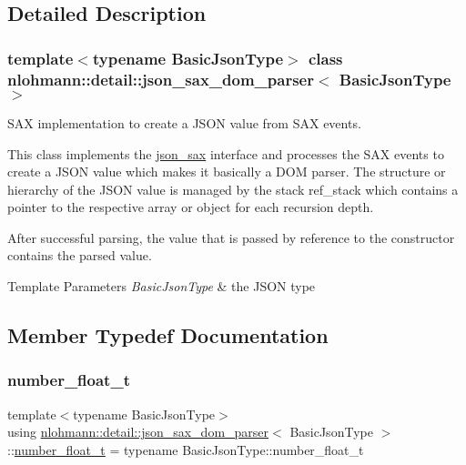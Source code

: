 \subsection{Detailed Description}
\subsubsection*{template$<$typename Basic\+Json\+Type$>$\newline
class nlohmann\+::detail\+::json\+\_\+sax\+\_\+dom\+\_\+parser$<$ Basic\+Json\+Type $>$}

S\+AX implementation to create a J\+S\+ON value from S\+AX events. 

This class implements the \mbox{\hyperlink{structnlohmann_1_1json__sax}{json\+\_\+sax}} interface and processes the S\+AX events to create a J\+S\+ON value which makes it basically a D\+OM parser. The structure or hierarchy of the J\+S\+ON value is managed by the stack {\ttfamily ref\+\_\+stack} which contains a pointer to the respective array or object for each recursion depth.

After successful parsing, the value that is passed by reference to the constructor contains the parsed value.


\begin{DoxyTemplParams}{Template Parameters}
{\em Basic\+Json\+Type} & the J\+S\+ON type \\
\hline
\end{DoxyTemplParams}


\subsection{Member Typedef Documentation}
\mbox{\label{classnlohmann_1_1detail_1_1json__sax__dom__parser_ad8da3aad0147b18b3cb76868480300fe}} 
\subsubsection{\texorpdfstring{number\_float\_t}{number\_float\_t}}
{\footnotesize\ttfamily template$<$typename Basic\+Json\+Type$>$ \\
using \mbox{\hyperlink{classnlohmann_1_1detail_1_1json__sax__dom__parser}{nlohmann\+::detail\+::json\+\_\+sax\+\_\+dom\+\_\+parser}}$<$ Basic\+Json\+Type $>$\+::\mbox{\hyperlink{classnlohmann_1_1detail_1_1json__sax__dom__parser_ad8da3aad0147b18b3cb76868480300fe}{number\+\_\+float\+\_\+t}} =  typename Basic\+Json\+Type\+::number\+\_\+float\+\_\+t}

